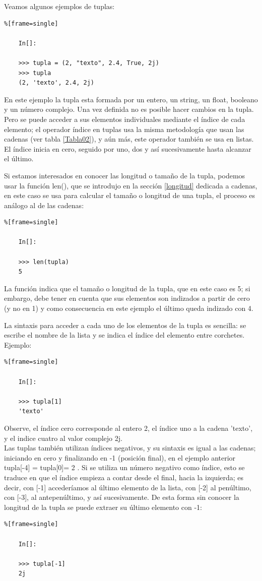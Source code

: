 Veamos algunos ejemplos de tuplas:

\begin{lstlisting}%[frame=single]
	
	In[]:
	
	>>> tupla = (2, "texto", 2.4, True, 2j)
	>>> tupla
	(2, 'texto', 2.4, 2j)
\end{lstlisting}
En este ejemplo la tupla esta formada por un entero, un string, un float, booleano y un número complejo. Una vez definida no es posible hacer cambios en la tupla. Pero se puede acceder a sus elementos individuales mediante
el índice de cada elemento; el operador índice en tuplas usa la misma metodología que usan las cadenas (ver tabla \ref{Tabla02}), y aún más, este operador también se usa en listas. El índice  inicia en cero, seguido por uno, dos y así sucesivamente hasta alcanzar el último. 

Si estamos interesados en conocer las longitud o tamaño de la tupla, podemos usar la función {\ttfamily len()}, que se introdujo en la sección \ref{longitud} dedicada a cadenas, en este caso se usa para calcular el tamaño o longitud  de una tupla, el proceso es análogo al de las cadenas: 
\begin{lstlisting}%[frame=single]
	
	In[]:
	
	>>> len(tupla)
	5 	
\end{lstlisting}
La función indica que el tamaño o longitud de la tupla, que en este caso  es 5; si embargo, debe tener en cuenta que sus elementos son indizados a partir de cero (y no en 1) y como consecuencia en este ejemplo el último queda indizado con 4. 

La sintaxis para acceder a cada uno de los elementos de la tupla es sencilla:  se  escribe el nombre de la lista y se  indica el índice del elemento entre corchetes. Ejemplo:

\begin{lstlisting}%[frame=single]
	
	In[]:
	
	>>> tupla[1]
	'texto'		
\end{lstlisting}
Observe, el índice cero corresponde al entero 2, el índice uno a la cadena 'texto', y el indice cuatro al valor complejo 2j.\\

Las tuplas también utilizan índices negativos, y su sintaxis es igual a las cadenas; iniciando en cero  y finalizando en -1 (posición final), en el ejemplo anterior {\ttfamily  tupla[-4] = tupla[0]= 2 }.
Si se utiliza un número negativo como índice, esto se traduce en que el índice empieza a contar desde el final, hacia la izquierda; es decir, con [-1] accederíamos al último elemento de la lista, con [-2] al penúltimo, con [-3], al antepenúltimo, y así sucesivamente. De esta forma sin conocer la longitud de la tupla se puede extraer su último elemento con -1:     
\begin{lstlisting}%[frame=single]
	
	In[]:
	
	>>> tupla[-1]
	2j	
\end{lstlisting}


